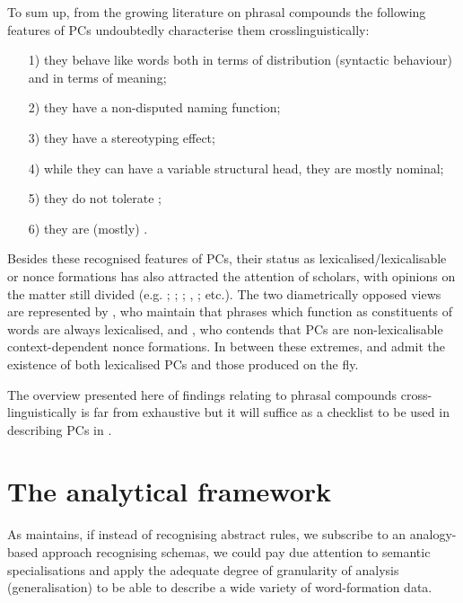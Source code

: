 \documentclass[output=paper]{LSP/langsci}
\begin{document}
To sum up, from the growing literature on phrasal compounds the following features of PCs undoubtedly characterise them crosslinguistically:

\begin{itemize}

\item[1)]  they behave like words both in terms of distribution (syntactic behaviour) and in terms of meaning;

\item[2)]  they have a non-disputed naming function;

\item[3)]  they have a stereotyping effect;

\item[4)]  while they can have a variable structural head, they are mostly nominal;

\item[5)] they do not tolerate ;

\item[6)]  they are (mostly) . \end{itemize} 


Besides these recognised features of PCs, their status as lexicalised\slash lexicalis\-able or nonce formations has also attracted the attention of scholars, with opinions on the matter still divided (e.g.  \citealt{BresnanMchombo1995}; \citealt{Hohenhaus1998}; \citealt{Meibauer2007}; \citealt{Trips2012}, \citeyear{Trips2016}; etc.). The two diametrically opposed views are represented by \citet{BresnanMchombo1995}, who maintain that phrases which function as constituents of words are always lexicalised, and \citet{Hohenhaus1998}, who contends that PCs are non-lexicalisable context-dependent nonce formations. In between these extremes, \citet{Trips2012,Trips2016} and \citet{Meibauer2007} admit the existence of both lexicalised PCs and those produced on the fly. 

The overview presented here of findings relating to phrasal compounds cross-linguistically is far from exhaustive but it will suffice as a checklist to be used in describing PCs in .

\section{The analytical framework}\label{sec:bagasheva:3}

As \citet[93]{Booij2010} maintains, if instead of recognising abstract rules, we subscribe to an anal\-ogy-based approach recognising  schemas, we could pay due attention to semantic specialisations and apply the adequate degree of granularity of analysis (generalisation) to be able to describe a wide variety of word-formation data. 
\end{document}
